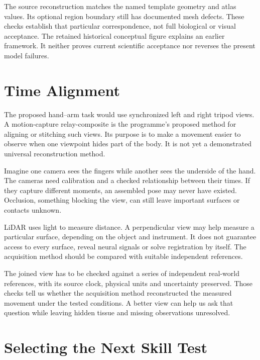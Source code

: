 The source reconstruction matches the named template geometry and atlas values. Its optional region boundary still has documented mesh defects. These checks establish that particular correspondence, not full biological or visual acceptance. The retained historical conceptual figure explains an earlier framework. It neither proves current scientific acceptance nor reverses the present model failures.\par

\section{Time Alignment}

The proposed hand--arm task would use synchronized left and right tripod views. A motion-capture relay-composite is the programme's proposed method for aligning or stitching such views. Its purpose is to make a movement easier to observe when one viewpoint hides part of the body. It is not yet a demonstrated universal reconstruction method.\par

Imagine one camera sees the fingers while another sees the underside of the hand. The cameras need calibration and a checked relationship between their times. If they capture different moments, an assembled pose may never have existed. Occlusion, something blocking the view, can still leave important surfaces or contacts unknown.\par

LiDAR uses light to measure distance. A perpendicular view may help measure a particular surface, depending on the object and instrument. It does not guarantee access to every surface, reveal neural signals or solve registration by itself. The acquisition method should be compared with suitable independent references.\par

The joined view has to be checked against a series of independent real-world references, with its source clock, physical units and uncertainty preserved. Those checks tell us whether the acquisition method reconstructed the measured movement under the tested conditions. A better view can help us ask that question while leaving hidden tissue and missing observations unresolved.\par

\section{Selecting the Next Skill Test}

